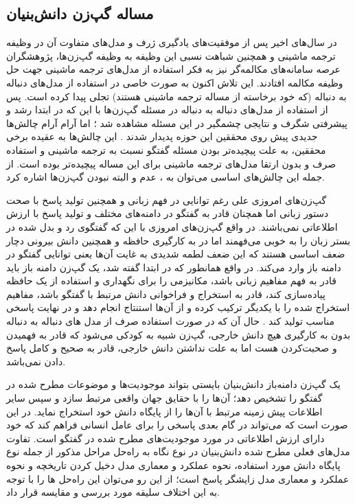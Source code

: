 \subsection{مساله گپ‌زن دانش‌بنیان}\label{chap1:knowledge_problem}
در سال‌های اخیر پس از موفقیت‌های یادگیری ژرف  و مدل‌های متفاوت آن در وظیفه ترجمه ماشینی و همچنین شباهت نسبی این وظیفه به وظیفه گپ‌زن‌ها، پژوهشگران عرصه سامانه‌های مکالمه‌گر نیز به فکر استفاده از مدل‌های ترجمه ماشینی جهت حل وظیفه مکالمه افتادند. این تلاش اکنون به صورت خاصی در استفاده از مدل‌های دنباله به دنباله (که خود برخاسته از مساله ترجمه ماشینی هستند) تجلی پیدا کرده است. پس از استفاده از مدل‌های دنباله به دنباله در مسئله گپ‌زن‌ها با این که در ابتدا رشد و پیشرفتی شگرف و نتایجی چشمگیر در این مسئله مشاهده شد
؛
اما آرام آرام چالش‌ها جدیدی پیش روی محققین این حوزه پدیدار شدند
\cite{A_Neural_Conversational_Model}.
 این چالش‌ها به عقیده برخی محققین، به علت پیچیده‌تر بودن مسئله گفتگو نسبت به ترجمه ماشینی و استفاده صرف و بدون ارتقا مدل‌های ترجمه ماشینی برای این مساله پیچیده‌تر بوده است. از جمله این چالش‌های اساسی می‌توان به 
، عدم
 و البته 
نبودن گپ‌زن‌ها اشاره کرد.

گپ‌زن‌های امروزی علی رغم توانایی در فهم زبانی و همچنین تولید پاسخ با صحت دستور زبانی اما همچنان قادر به 
گفتگو در دامنه‌های مختلف و تولید پاسخ با ارزش اطلاعاتی نمی‌باشند. در واقع گپ‌زن‌های امروزی با این که گفتگوی رد و بدل شده در بستر زبان را به خوبی می‌فهمند اما در به کارگیری حافظه و همچنین دانش بیرونی دچار ضعف اساسی هستند که این ضعف لطمه شدیدی به غایت آن‌ها یعنی توانایی گفتگو در دامنه باز وارد می‌کند. در واقع همانطور که در ابتدا گفته شد، یک گپ‌زن دامنه باز باید قادر به فهم مفاهیم زبانی باشد، مکانیزمی را برای نگهداری و استفاده از یک حافظه پیاده‌سازی کند، قادر به استخراج و فراخوانی دانش مرتبط با گفتگو باشد، مفاهیم استخراج‌ شده را با یکدیگر ترکیب کرده و از آن‌ها استنتاج انجام دهد و در نهایت پاسخی مناسب تولید کند
\cite{wizard}
.
حال آن که در صورت استفاده صرف از مدل های دنباله به دنباله بدون به کارگیری هیچ دانش خارجی، گپ‌زن شبیه به کودکی می‌شود که قادر به فهمیدن و صحبت‌کردن هست اما به علت نداشتن دانش خارجی، قادر به صحیح و کامل پاسخ دادن نمی‌باشد.

یک گپ‌زن دامنه‌باز دانش‌بنیان بایستی بتواند موجودیت‌ها و موضوعات مطرح شده در گفتگو را تشخیص دهد؛ آن‌ها را با حقایق جهان واقعی مرتبط سازد و سپس سایر اطلاعات 
پیش زمینه مرتبط با آن‌ها را از پایگاه دانش خود استخراج نماید. 
در این صورت است که می‌تواند در گام بعدی پاسخی را برای عامل انسانی فراهم کند که خود دارای ارزش اطلاعاتی در مورد موجودیت‌های مطرح شده در گفتگو است. 
تفاوت مدل‌های فعلی مطرح شده دانش‌بنیان در نوع نگاه به راه‌حل مراحل مذکور 
از جمله نوع پایگاه دانش مورد استفاده، نحوه عملکرد و معماری مدل دخیل کردن تاریخچه و نحوه عملکرد و معماری مدل زایشگر پاسخ
است؛ از این رو می‌توان این راه‌حل ها را با توجه به این اختلاف سلیقه مورد بررسی و مقایسه قرار داد. 

